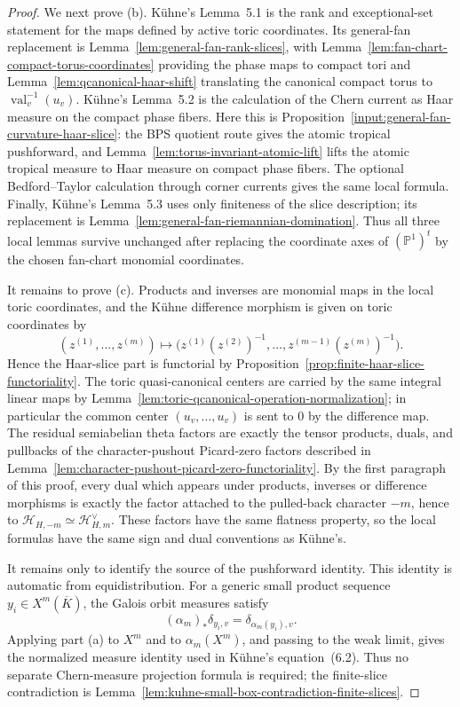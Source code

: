 \documentclass[10pt,a4paper]{amsart}
\theoremstyle{plain}
\DeclareMathOperator{\val}{val}
\theoremstyle{plain}
\numberwithin{equation}{section}
\begin{document}
\begin{proof}
	We next prove (b).  K\"uhne's Lemma~5.1 is the rank and exceptional-set
	statement for the maps defined by active toric coordinates.  Its general-fan
	replacement is Lemma~\ref{lem:general-fan-rank-slices}, with
	Lemma~\ref{lem:fan-chart-compact-torus-coordinates} providing the phase maps
	to compact tori and Lemma~\ref{lem:qcanonical-haar-shift} translating the
	canonical compact torus to \(\val_v^{-1}(u_v)\).  K\"uhne's Lemma~5.2 is the
	calculation of the Chern current as Haar measure on the compact phase fibers.
	Here this is Proposition~\ref{input:general-fan-curvature-haar-slice}: the BPS
	quotient route gives the atomic tropical pushforward, and
	Lemma~\ref{lem:torus-invariant-atomic-lift} lifts the atomic tropical measure
	to Haar measure on compact phase fibers.  The optional Bedford--Taylor
	calculation through corner currents gives the same local formula.  Finally,
	K\"uhne's Lemma~5.3 uses only finiteness of the slice description; its
	replacement is Lemma~\ref{lem:general-fan-riemannian-domination}.  Thus all
	three local lemmas survive unchanged after replacing the coordinate axes of
	\((\mathbb P^1)^t\) by the chosen fan-chart monomial coordinates.
	
	It remains to prove (c).  Products and inverses are monomial maps in the local
	toric coordinates, and the K\"uhne difference morphism is given on toric
	coordinates by
	\[
	(z^{(1)},\ldots,z^{(m)})
	\longmapsto
	\bigl(z^{(1)}(z^{(2)})^{-1},\ldots,
	z^{(m-1)}(z^{(m)})^{-1}\bigr).
	\]
	Hence the Haar-slice part is functorial by
	Proposition~\ref{prop:finite-haar-slice-functoriality}.  The toric
	quasi-canonical centers are carried by the same integral linear maps by
	Lemma~\ref{lem:toric-qcanonical-operation-normalization}; in particular the
	common center \((u_v,\ldots,u_v)\) is sent to \(0\) by the difference map.
	The residual semiabelian theta factors are exactly the tensor products, duals,
	and pullbacks of the character-pushout Picard-zero factors described in
	Lemma~\ref{lem:character-pushout-picard-zero-functoriality}.  By the first
	paragraph of this proof, every dual which appears under products, inverses or
	difference morphisms is exactly the factor attached to the pulled-back
	character \(-m\), hence to
	\(\mathcal H_{H,-m}\simeq\mathcal H_{H,m}^{\vee}\).  These factors have the
	same flatness property, so the local formulas have the same sign and dual
	conventions as K\"uhne's.
	
	It remains only to identify the source of the pushforward identity.  This
	identity is automatic from equidistribution.  For a generic small product
	sequence \(y_i\in X^m(\overline K)\), the Galois orbit measures satisfy
	\[
	(\alpha_m)_*\delta_{y_i,v}=\delta_{\alpha_m(y_i),v}.
	\]
	Applying part (a) to \(X^m\) and to \(\alpha_m(X^m)\), and passing to the weak
	limit, gives the normalized measure identity used in K\"uhne's
	equation~(6.2).  Thus no separate Chern-measure projection formula is required;
	the finite-slice contradiction is
	Lemma~\ref{lem:kuhne-small-box-contradiction-finite-slices}.
\end{proof}
\end{document}

